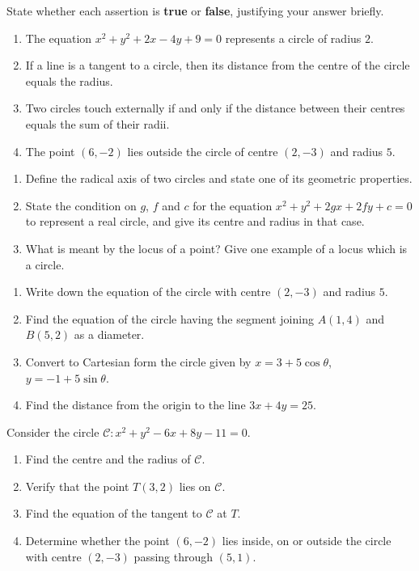 \documentclass[11pt]{article}
\newcommand{\cle}[1]{{\popxbold\color{popdark}#1}}
\newcounter{popsec}
\newcounter{popsub}
\newcommand{\courssub}[1]{%
  \stepcounter{popsub}%
  \par\vspace{9pt}\noindent{\popxbold\fontsize{11.5}{13}\selectfont\color{popink}{\color{poporange}\thepopsec.\thepopsub}\hspace{6pt}#1}\par\nopagebreak\vspace{4pt}
}
\begin{document}
\begin{exercice}
State whether each assertion is \textbf{true} or \textbf{false}, justifying your answer briefly.
\begin{enumerate}
\item The equation $x^{2}+y^{2}+2x-4y+9=0$ represents a circle of radius $2$.
\item If a line is a tangent to a circle, then its distance from the centre of the circle equals the radius.
\item Two circles touch externally if and only if the distance between their centres equals the sum of their radii.
\item The point $(6,-2)$ lies outside the circle of centre $(2,-3)$ and radius $5$.
\end{enumerate}
\end{exercice}

\begin{exercice}
\begin{enumerate}
\item Define the \cle{radical axis} of two circles and state one of its geometric properties.
\item State the condition on $g$, $f$ and $c$ for the equation $x^{2}+y^{2}+2gx+2fy+c=0$ to represent a real circle, and give its centre and radius in that case.
\item What is meant by the \cle{locus} of a point? Give one example of a locus which is a circle.
\end{enumerate}
\end{exercice}

\begin{exercice}
\begin{enumerate}
\item Write down the equation of the circle with centre $(2,-3)$ and radius $5$.
\item Find the equation of the circle having the segment joining $A(1,4)$ and $B(5,2)$ as a diameter.
\item Convert to Cartesian form the circle given by $x=3+5\cos\theta$, $y=-1+5\sin\theta$.
\item Find the distance from the origin to the line $3x+4y=25$.
\end{enumerate}
\end{exercice}

\courssub{I practise}

\begin{exercice}
Consider the circle $\mathcal{C}: x^{2}+y^{2}-6x+8y-11=0$.
\begin{enumerate}
\item Find the centre and the radius of $\mathcal{C}$.
\item Verify that the point $T(3,2)$ lies on $\mathcal{C}$.
\item Find the equation of the tangent to $\mathcal{C}$ at $T$.
\item Determine whether the point $(6,-2)$ lies inside, on or outside the circle with centre $(2,-3)$ passing through $(5,1)$.
\end{enumerate}
\end{exercice}
\end{document}
